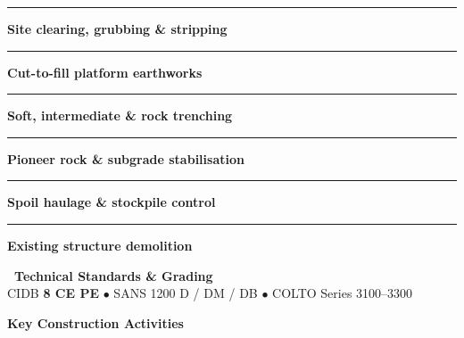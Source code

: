 \documentclass[a4paper,11pt]{article}
\begin{document}
\begin{minipage}[t]{0.34\textwidth}
    \vspace{0pt}
    \begin{tcolorbox}[
        enhanced, colback=mhoffwhite, colframe=mhnavy, boxrule=0.9pt, arc=4pt,
        title={\bfseries\color{white}\faTractor\ Scope of Work},
        colbacktitle=mhnavy, left=7pt, right=7pt, top=5pt, bottom=5pt, drop shadow=black!5
    ]
        \fontsize{7.8pt}{10.8pt}\selectfont
        \textcolor{mhnavy}{\rule{3.5pt}{3.5pt}}\hspace{4pt}\textbf{Site clearing, grubbing \& stripping}\\
        \textcolor{mhnavy}{\rule{3.5pt}{3.5pt}}\hspace{4pt}\textbf{Cut-to-fill platform earthworks}\\
        \textcolor{mhnavy}{\rule{3.5pt}{3.5pt}}\hspace{4pt}\textbf{Soft, intermediate \& rock trenching}\\
        \textcolor{mhnavy}{\rule{3.5pt}{3.5pt}}\hspace{4pt}\textbf{Pioneer rock \& subgrade stabilisation}\\
        \textcolor{mhnavy}{\rule{3.5pt}{3.5pt}}\hspace{4pt}\textbf{Spoil haulage \& stockpile control}\\
        \textcolor{mhnavy}{\rule{3.5pt}{3.5pt}}\hspace{4pt}\textbf{Existing structure demolition}
    \end{tcolorbox}

    \vspace{0.12cm}

    \begin{tcolorbox}[
        enhanced, colback=white, colframe=mhlightgray, boxrule=0.8pt, arc=4pt,
        left=6pt, right=6pt, top=5pt, bottom=5pt, drop shadow=black!3
    ]
        {\fontsize{7.5pt}{9.6pt}\selectfont\bfseries\color{mhnavy}\faCheckDouble\ Technical Standards \& Grading}\\[2pt]
        {\fontsize{7.3pt}{9.4pt}\selectfont\color{mhtextmuted}
        CIDB \textbf{8 CE PE} $\bullet$ SANS 1200 D / DM / DB $\bullet$ COLTO Series 3100--3300}
    \end{tcolorbox}
\end{minipage}

\vfill

{\large\bfseries\color{mhnavy} Key Construction Activities}
\vspace{0.10cm}
\end{document}
